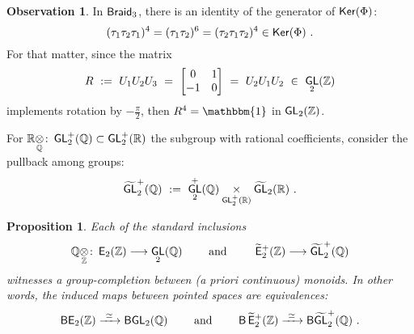 \documentclass{amsart}
\newtheorem{prop}[theorem]{Proposition}
\theoremstyle{definition}
\newtheorem{observation}[theorem]{Observation}
\theoremstyle{remark}
\DeclareMathOperator{\Ker}{\sf Ker}
\def\ot{\otimes}
\newcommand{\w}{\widetilde}
\newcommand{\xra}{\xrightarrow}
\def\QQ{\mathbb Q}\def\RR{\mathbb R}\def\SS{\mathbb S}\def\TT{\mathbb T}
\def\sE{\mathsf E}\def\sF{\mathsf F}\def\sG{\mathsf G}\def\sH{\mathsf H}
\DeclareMathOperator{\uno}{\mathbbm{1}}
\DeclareMathOperator{\Braid}{{\sf Braid}_3}
\DeclareMathOperator{\Ebraid}{\w{\sf E}_{2}^{+}(\ZZ)}
\DeclareMathOperator{\GL}{\sf GL}
\DeclareMathOperator{\EZ}{\sE_2(\ZZ)}
\begin{document}
\begin{observation}
In $\Braid$, there is an identity of the generator of $\Ker(\Phi)$:
\[
(\tau_{1} \tau_{2} \tau_{1})^4 
=
( \tau_{1} \tau_{2})^6
=
(\tau_{2} \tau_{1} \tau_{2})^4
\in {\sf Ker}(\Phi)
~.
\]
For that matter, since the matrix
\begin{equation}
\label{e64}
R~:=~ U_1 U_2 U_3 ~=~ 
\begin{bmatrix}
0 & 1 
\\
-1 & 0
\end{bmatrix}
~=~
U_2 U_1 U_2
~\in~\GL_2(\ZZ)
\end{equation}
implements rotation by $-\frac{\pi}{2}$, 
then $R^4 = \uno$ in $\GL_2(\ZZ)$.

\end{observation}



For $\RR\underset{\QQ}\ot \colon \GL_2^+(\QQ)\subset \GL_2^+(\RR)$ the subgroup with rational coefficients, consider the pullback among groups:
\[
\w{\GL}_2^+(\QQ)
~:=~
\GL_2^+(\QQ)
\underset{
\GL_2^+(\RR)
}
\times
\w{\GL}_2(\RR)
~.
\]
\begin{prop}
\label{t59}
Each of the standard inclusions
\[
\QQ\underset{\ZZ}\ot
\colon
\EZ
\longrightarrow
\GL_2(\QQ)
\qquad
\text{ and }
\qquad
\Ebraid
\longrightarrow
\w{\GL}_2^+(\QQ)
\]
witnesses a group-completion between (a priori continuous) monoids.
In other words, the induced maps between pointed spaces are equivalences:
\[
{\sf BE}_2(\ZZ)
\xra{~\simeq~}
{\sf BGL}_2(\QQ)
\qquad
\text{ and }
\qquad
\sB
\Ebraid
\xra{~\simeq~}
{\sf B \w{GL}}_2^+(\QQ)
~.
\]

\end{prop}
\end{document}
